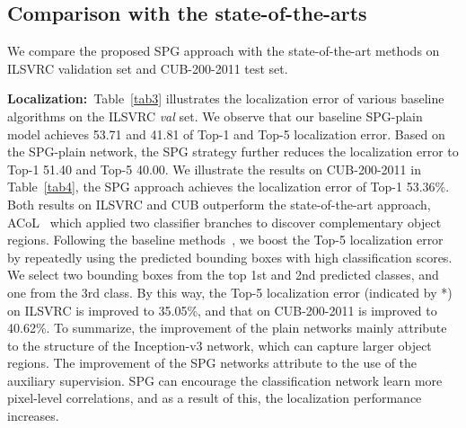 \documentclass[runningheads]{llncs}
\begin{document}
\subsection{Comparison with the state-of-the-arts}
We compare the proposed SPG approach with the state-of-the-art methods on ILSVRC validation set and CUB-200-2011 test set.

\textbf{Localization:}~Table~\ref{tab3}
illustrates the localization error of various baseline algorithms on the ILSVRC \emph{val} set.
We observe that our baseline SPG-plain model achieves 53.71 and 41.81 of Top-1 and Top-5 localization error.
Based on the SPG-plain network, the SPG strategy further reduces the localization error to Top-1 51.40 and Top-5 40.00.
We illustrate the results on CUB-200-2011 in Table~\ref{tab4}, the SPG approach achieves the localization error of Top-1 53.36\%.
Both results on ILSVRC and CUB outperform the state-of-the-art approach, ACoL~\cite{zhang2018adversarial} which applied two classifier branches to discover complementary object regions.
Following the baseline methods~\cite{zhou2015cnnlocalization,zhang2018adversarial}, we boost the Top-5 localization error by repeatedly using the predicted bounding boxes with high classification scores. 
We select two bounding boxes from the top 1st and 2nd predicted classes, and one from the 3rd class. 
By this way, the Top-5 localization error (indicated by *) on ILSVRC is improved to 35.05\%, and that on CUB-200-2011 is improved to 40.62\%.
To summarize, the improvement of the plain networks mainly attribute to the structure of the Inception-v3 network, which can capture larger object regions.
The improvement of the SPG networks attribute to the use of the auxiliary supervision. 
SPG can encourage the classification network learn more pixel-level correlations, and as a result of this, the localization performance increases.
\end{document}

